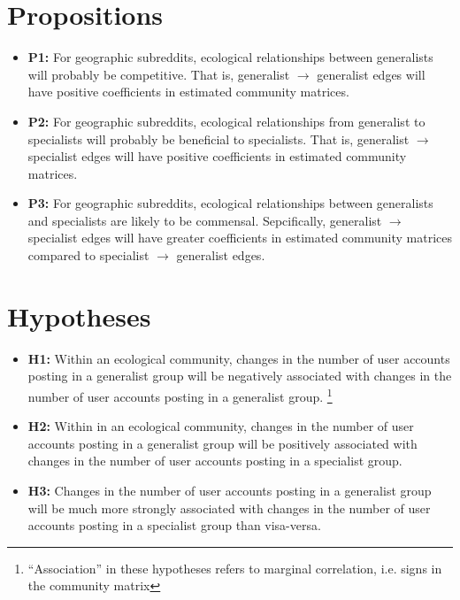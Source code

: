 \documentclass[12pt]{memoir}
\begin{document}
\section{Propositions}

\begin{itemize}
\item \textbf{P1:} For geographic subreddits, ecological relationships between generalists will probably be competitive. That is, generalist $\rightarrow$ generalist edges will have positive coefficients in estimated community matrices. 

\item \textbf{P2:} For geographic subreddits, ecological relationships from generalist to specialists will probably be beneficial to specialists. That is, generalist $\rightarrow$ specialist edges will have positive coefficients in estimated community matrices.

\item \textbf{P3:} For geographic subreddits, ecological relationships between generalists and specialists are likely to be commensal. Sepcifically, generalist $\rightarrow$ specialist edges will have greater coefficients in estimated community matrices compared to specialist $\rightarrow$ generalist edges. 

\end{itemize}

\section{Hypotheses}
\begin{itemize}

\item \textbf{H1:} Within an ecological community, changes in the number of user accounts posting in a generalist group will be negatively associated with changes in the number of user accounts posting in a generalist group.  \footnote{``Association'' in these hypotheses refers to marginal correlation, i.e. signs in the community matrix}

\item \textbf{H2:} Within in an ecological community, changes in the number of user accounts posting in a generalist group will be positively associated with changes in the number of user accounts posting in a specialist group.

\item \textbf{H3:} Changes in the number of user accounts posting in a generalist group will be much more strongly associated with changes in the number of user accounts posting in a specialist group than visa-versa.

\end{itemize}
\end{document}
